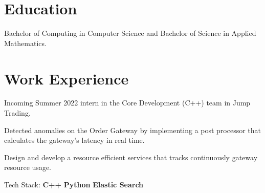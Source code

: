 \documentclass[]{Klement_Resume}
\begin{document}
%
%

%
%


\begin{minipage}[t]{1\textwidth} 


  \section{Education} 

  Bachelor of Computing in Computer Science and Bachelor of Science in Applied Mathematics.
  \sectionsep

    \section{Work Experience}
    \vspace{\topsep} %
    \begin{tightemize}
      \item Incoming Summer 2022 intern in the Core Development (C++) team in Jump Trading.
    \end{tightemize}
    \sectionsep

    \begin{tightemize}
    \item Detected anomalies on the Order Gateway by implementing a post processor that calculates the gateway's latency in real time.
    \item Design and develop a resource efficient services that tracks continuously gateway resource usage.
    \item Tech Stack: {\bf C++} \textbullet{} {\bf Python} \textbullet{} {\bf Elastic Search}
    \end{tightemize}
    \sectionsep


\end{minipage}
\end{document}
